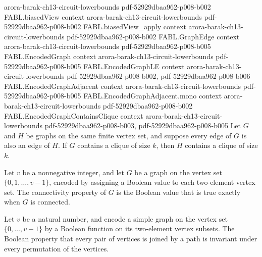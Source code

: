 \begin{theorem}
  {arora-barak-ch13-circuit-lowerbounds}
  {pdf-52929dbaa962-p008-b002}
\proofstep
  {FABL.biasedView}
  {context}
  {arora-barak-ch13-circuit-lowerbounds}
  {pdf-52929dbaa962-p008-b002}
\proofstep
  {FABL.biasedView_apply}
  {context}
  {arora-barak-ch13-circuit-lowerbounds}
  {pdf-52929dbaa962-p008-b002}
\proofstep
  {FABL.GraphEdge}
  {context}
  {arora-barak-ch13-circuit-lowerbounds}
  {pdf-52929dbaa962-p008-b005}
\proofstep
  {FABL.EncodedGraph}
  {context}
  {arora-barak-ch13-circuit-lowerbounds}
  {pdf-52929dbaa962-p008-b005}
\proofstep
  {FABL.EncodedGraphLE}
  {context}
  {arora-barak-ch13-circuit-lowerbounds}
  {pdf-52929dbaa962-p008-b002,
    pdf-52929dbaa962-p008-b006}
\proofstep
  {FABL.EncodedGraphAdjacent}
  {context}
  {arora-barak-ch13-circuit-lowerbounds}
  {pdf-52929dbaa962-p008-b005}
\proofstep
  {FABL.EncodedGraphAdjacent.mono}
  {context}
  {arora-barak-ch13-circuit-lowerbounds}
  {pdf-52929dbaa962-p008-b002}
\proofstep
  {FABL.EncodedGraphContainsClique}
  {context}
  {arora-barak-ch13-circuit-lowerbounds}
  {pdf-52929dbaa962-p008-b003,
    pdf-52929dbaa962-p008-b005}
Let $G$ and $H$ be graphs on the same finite vertex set, and suppose every edge of $G$
is also an edge of $H$. If $G$ contains a clique of size $k$, then $H$ contains a clique
of size $k$.
\end{theorem}

\begin{definition}
\label{FABL.connectivityGraphProperty}
\leanok
{}
Let $v$ be a nonnegative integer, and let $G$ be a graph on the vertex set
$\{0,1,\ldots,v-1\}$, encoded by assigning a Boolean value to each two-element vertex
set. The connectivity property of $G$ is the Boolean value that is true exactly when $G$
is connected.
\end{definition}

\begin{theorem}
\label{FABL.connectivity_isGraphProperty}
\leanok
{}
Let $v$ be a natural number, and encode a simple graph on the vertex set
$\{0,\ldots,v-1\}$ by a Boolean function on its two-element vertex subsets. The Boolean
property that every pair of vertices is joined by a path is invariant under every
permutation of the vertices.
\end{theorem}

